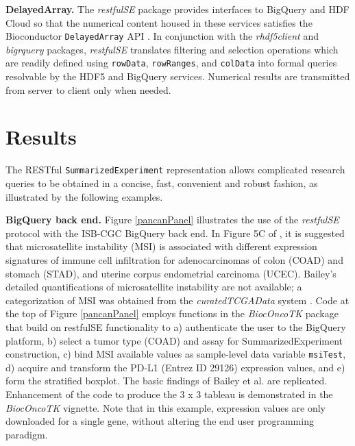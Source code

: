 \documentclass[applications]{gen-bioinformatics}
\newcommand{\Rpackage}[1]{{\textit{#1}}}
\begin{document}
\noindent
\textbf{DelayedArray.}
The \Rpackage{restfulSE} package provides interfaces to 
BigQuery and HDF Cloud so that 
the numerical content housed in these services
satisfies the Bioconductor \verb+DelayedArray+ API \citep{Pages2018}.  
In conjunction with the \Rpackage{rhdf5client} and \Rpackage{bigrquery} packages,
\Rpackage{restfulSE} translates filtering and selection operations
which are readily defined using \verb+rowData+, \verb+rowRanges+,
and \verb+colData+ into formal queries resolvable by the HDF5 and
BigQuery services.  Numerical results are transmitted from
server to client only when needed.

\section*{Results}

The RESTful \verb+SummarizedExperiment+ representation
allows complicated research queries to be obtained in a concise,
fast, convenient and robust fashion, as illustrated by
the following examples.

\textbf{BigQuery back end.} Figure \ref{pancanPanel} illustrates the 
use of the \Rpackage{restfulSE} protocol
with the ISB-CGC BigQuery back end.  In Figure 5C
of \citet{Bailey2018}, it is suggested that
microsatellite instability (MSI) is associated with
different expression signatures of immune cell infiltration
for adenocarcinomas of colon (COAD) and stomach (STAD), and
uterine corpus endometrial carcinoma (UCEC).  Bailey's
detailed quantifications of microsatellite instability
are not available; a categorization of MSI was
obtained from the \Rpackage{curatedTCGAData} system \citep{Ramos2017}.
Code at the top of Figure \ref{pancanPanel} employs
functions in the \Rpackage{BiocOncoTK} package that build on
restfulSE functionality to a) authenticate the
user to the BigQuery platform, b) select a tumor
type (COAD) and assay for SummarizedExperiment
construction, c) bind MSI available values as
sample-level data variable \verb+msiTest+, d)
acquire and transform the PD-L1 
(Entrez ID 29126)
expression values, and e) form the stratified boxplot. 
The basic findings of Bailey et al. are replicated.
Enhancement of the code to produce the 3 x 3 tableau
is demonstrated in the \Rpackage{BiocOncoTK} vignette.
Note that in this example, expression values are
only downloaded for a single gene, without altering
the end user programming paradigm.
\end{document}
